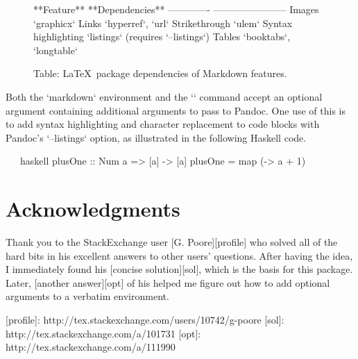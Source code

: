 \documentclass{article}
\begin{document}

\begin{figure}[t]
\begin{markdown}
**Feature**          **Dependencies**
-------------        -----------------------
Images               `graphicx`
Links                `hyperref`, `url`
Strikethrough        `ulem`
Syntax highlighting  `listings` (requires `--listings`)
Tables               `booktabs`, `longtable`

Table: \LaTeX\ package dependencies of Markdown features. \label{tbl:dep} 
\end{markdown}
\end{figure}

\begin{markdown}
Both the `markdown` environment and the `\markd` command accept an optional
argument containing additional arguments to pass to Pandoc. One use of this is
to add syntax highlighting and character replacement to code blocks with
Pandoc's `--listings` option, as illustrated in the following Haskell code.
\end{markdown}

\begin{markdown}[--listings]
~~~haskell
plusOne :: Num a => [a] -> [a]
plusOne = map (\a -> a + 1)
~~~
\end{markdown}


\section*{Acknowledgments}
\label{sec:ack}

\begin{markdown}
Thank you to the StackExchange user [G. Poore][profile] who solved all of the
hard bits in his excellent answers to other users' questions. After having the
idea, I immediately found his [concise solution][sol], which is the basis for
this package. Later, [another answer][opt] of his helped me figure out how to
add optional arguments to a verbatim environment.

[profile]: http://tex.stackexchange.com/users/10742/g-poore
[sol]: http://tex.stackexchange.com/a/101731
[opt]: http://tex.stackexchange.com/a/111990
\end{markdown}
\end{document}
